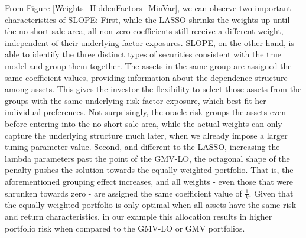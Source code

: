 \documentclass[12pt, a4paper]{article}
\newcommand{\bfSigma}{\boldsymbol{\Sigma} }
\newcommand{\red}[1]{{\color{red} #1}}
\begin{document}
From Figure \ref{Weights_HiddenFactors_MinVar}, we can observe two important characteristics of SLOPE: First, while the LASSO shrinks the weights up until the no short sale area, all non-zero coefficients still receive a different weight, independent of their underlying factor exposures. 
SLOPE, on the other hand, is able to identify the three distinct types of securities consistent with the true model and group them together. The assets in the same group are assigned the same coefficient values, providing information about the dependence structure among assets. This gives the investor the flexibility to select those assets from the groups with the same underlying risk factor exposure, which best fit her individual preferences. Not surprisingly, the oracle risk groups the assets even before entering into the no short sale area, while the actual weights can only capture the underlying structure much later, when we already impose a larger tuning parameter value.
Second, and different to the LASSO, increasing the lambda parameters past the point of the GMV-LO, the octagonal shape of the penalty pushes the solution towards the equally weighted portfolio. That is, the aforementioned grouping effect increases, and all weights - even those that were shrunken towards zero - are assigned the same coefficient value of $\frac{1}{k}$. Given that the equally weighted portfolio is only optimal when all assets have the same risk and return characteristics, in our example this allocation results in higher portfolio risk when compared to the GMV-LO or GMV portfolios.\\
%
\end{document}
